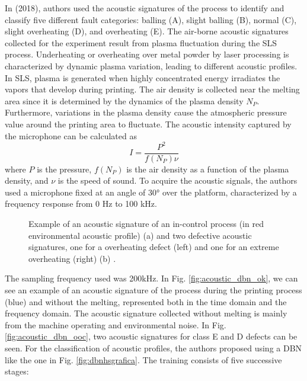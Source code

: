 In \citeauthor{ye_defect_2018} (2018), authors used the acoustic signatures of the process to identify and classify five different fault categories: balling (A), slight balling (B), normal (C), slight overheating (D), and overheating (E). The air-borne acoustic signatures collected for the experiment result from plasma fluctuation during the SLS process. Underheating or overheating over metal powder by laser processing is characterized by dynamic plasma variation, leading to different acoustic profiles. In SLS, plasma is generated when highly concentrated energy irradiates the vapors that develop during printing. The air density is collected near the melting area since it is determined by the dynamics of the plasma density $N_P$. Furthermore, variations in the plasma density cause the atmospheric pressure value around the printing area to fluctuate. The acoustic intensity captured by the microphone can be calculated as
\begin{equation}
I = \frac{P^2}{f(N_P)\nu}
\end{equation}
where $P$ is the pressure, $f(N_P)$ is the air density as a function of the plasma density, and $\nu$ is the speed of sound. To acquire the acoustic signals, the authors used a microphone fixed at an angle of 30° over the platform, characterized by a frequency response from 0 Hz to 100 kHz. 
\begin{figure}
    \centering
    \quad
    \caption[Acoustics process signatures.]{Example of an acoustic signature of an in-control process (in red environmental acoustic profile) (a) and two defective acoustic signatures, one for a overheating defect (left) and one for an extreme overheating (right) (b) \cite{ye_defect_2018}.}    
\end{figure}
The sampling frequency used was 200kHz. In Fig. \ref{fig:acoustic_dbn_ok}, we can see an example of an acoustic signature of the process during the printing process (blue) and without the melting, represented both in the time domain and the frequency domain. The acoustic signature collected without melting is mainly from the machine operating and environmental noise. In Fig. \ref{fig:acoustic_dbn_ooc}, two acoustic signatures for class E and D defects can be seen. For the classification of acoustic profiles, the authors proposed using a DBN like the one in Fig. \ref{fig:dbnhsgrafica}. The training consists of five successive stages:
